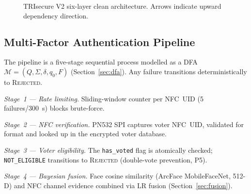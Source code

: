 \documentclass[pdflatex,sn-mathphys-num]{sn-jnl}%
\theoremstyle{thmstyleone}%
\theoremstyle{thmstyletwo}%
\theoremstyle{thmstylethree}%
\begin{document}
\begin{figure}[t]
\centering
{}
\caption{TRIsecure V2 six-layer clean architecture. Arrows indicate upward
  dependency direction.}
\label{fig:architecture}
\end{figure}

\subsection{Multi-Factor Authentication Pipeline}\label{sec:pipeline}

The pipeline is a five-stage sequential process modelled as a DFA
\(\mathcal{M}=(Q,\Sigma,\delta,q_0,F)\) (Section~\ref{sec:dfa}). Any failure
transitions deterministically to \textsc{Rejected}.

\textit{Stage~1 --- Rate limiting.} Sliding-window counter per NFC~UID
(5 failures/300~s) blocks brute-force.

\textit{Stage~2 --- NFC verification.} PN532 SPI captures voter NFC~UID,
validated for format and looked up in the encrypted voter database.

\textit{Stage~3 --- Voter eligibility.} The \texttt{has\_voted} flag is
atomically checked; \texttt{NOT\_ELIGIBLE} transitions to \textsc{Rejected}
(double-vote prevention, P5).

\textit{Stage~4 --- Bayesian fusion.} Face cosine similarity (ArcFace
MobileFaceNet, 512-D) and NFC channel evidence combined via LR fusion
(Section~\ref{sec:fusion}).
\end{document}
